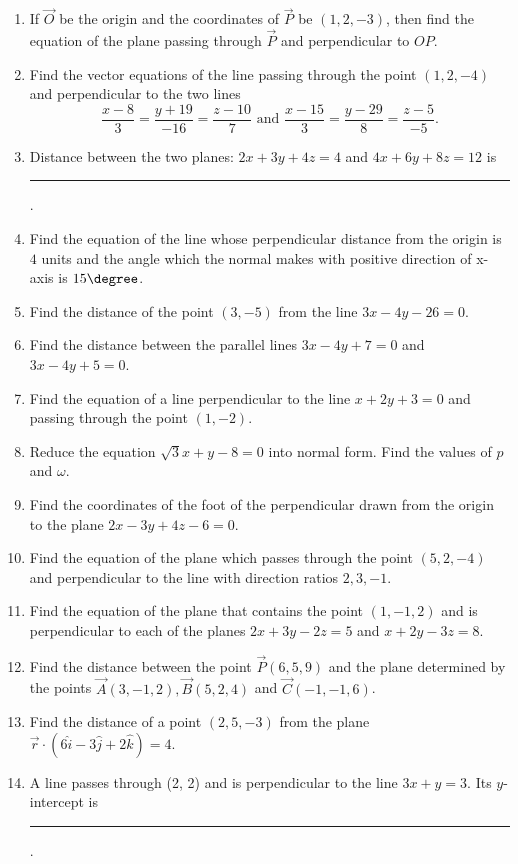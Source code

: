 \begin{enumerate}[label=\thesubsection.\arabic*, ref=\thesubsection.\theenumi]
\item If $\vec{O}$ be the origin and the coordinates of $\vec{P}$ be $(1, 2, -3)$,  then find the equation of the plane passing through $\vec{P}$ and perpendicular to $OP$.
\item Find the vector equations of the line passing through the point $(1, 2, -4)$ and perpendicular to the two lines
$$\frac{x-8}{3}=\frac{y+19}{-16}=\frac{z-10}{7}\text{ and } \frac{x-15}{3}=\frac{y-29}{8}=\frac{z-5}{-5}.$$
\item Distance between the two planes: $2x+3y+4z=4$ and $4x+6y+8z=12$ is \label{prob:22}
\rule{1cm}{0.1pt}.
\item Find the equation of the line whose perpendicular distance from the origin is $4$ units and the angle which the normal makes with positive direction of x-axis is $15\degree$.
\item Find the distance of the point $(3, -5)$ from the line $3x-4y-26=0$.
\item Find the distance between the parallel lines $3x-4y+7=0$ and $3x-4y+5=0$.
\item Find the equation of a line perpendicular to the line $x+2y+3=0$ and passing through the point $(1, -2)$.
\item Reduce the equation $\sqrt3x+y-8=0$ into normal form. Find the values of $p$ and $\omega$.
\item Find the coordinates of the foot of the perpendicular drawn from the origin to the plane $2x -3y +4z -6 = 0$.
\item Find the equation of the plane which passes through the point $(5,  2,  -4)$ and perpendicular to the line with direction ratios $2,  3,  -1$.
\item Find the equation of the plane that contains the point $(1,  -1,  2)$ and is perpendicular to each of the planes $2x +3y -2z =5$ and $x +2y -3z =8$.
\item Find the distance between the point $\vec{P}(6,  5,  9)$ and the plane determined by the points $\vec{A}(3,  -1, 2),  \vec{B}( 5,  2, 4)$ and $\vec{C}(-1,  -1,  6)$.
\item Find the distance of a point $(2,  5,  -3)$ from the plane $\overrightarrow{r} \cdot (6\hat{i} -3\hat{j} +2\hat{k}) =4$.
\item A line passes through (2, 2) and is perpendicular to the line $3x+y=3$. Its $y$-intercept is 
\rule{1cm}{0.1pt}.
		
\end{enumerate}
